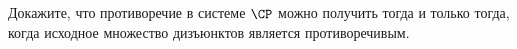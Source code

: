 Докажите, что противоречие в системе $\CP$ можно получить тогда и только тогда, когда исходное множество
дизъюнктов является противоречивым.
